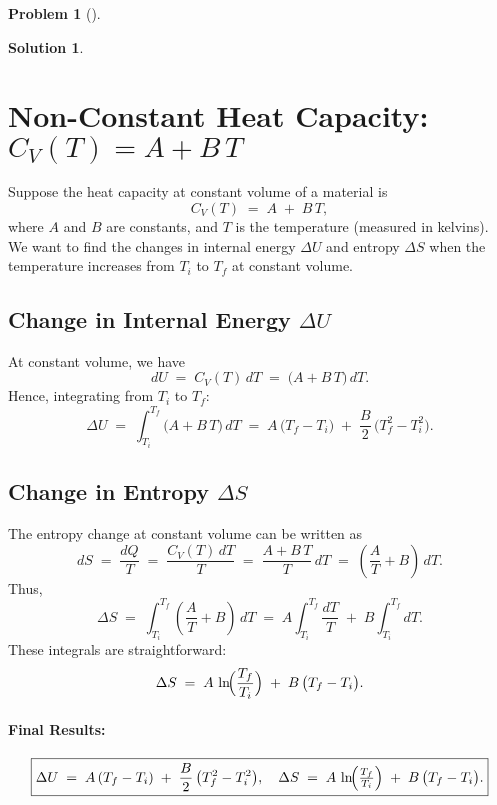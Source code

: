 \documentclass[12pt]{article}
\theoremstyle{definition} %
\newtheorem{solution}{Solution}
\newtheorem{problem}{Problem}
\theoremstyle{plain} %
\begin{document}
\begin{problem}[]
    
\end{problem}
\begin{solution}
    \section*{Non-Constant Heat Capacity: \texorpdfstring{$C_V(T) = A + B\,T$}{CV(T) = A + B T}}

Suppose the heat capacity at constant volume of a material is 
\[
C_V(T) \;=\; A \;+\; B\,T,
\]
where \(A\) and \(B\) are constants, and \(T\) is the temperature 
(measured in kelvins). We want to find the changes in internal energy 
\(\Delta U\) and entropy \(\Delta S\) when the temperature increases 
from \(T_i\) to \(T_f\) at constant volume.

\subsection*{Change in Internal Energy \(\Delta U\)}

At constant volume, we have
\[
dU \;=\; C_V(T)\,dT \;=\; \bigl(A + B\,T\bigr)\,dT.
\]
Hence, integrating from \(T_i\) to \(T_f\):
\[
\Delta U 
\;=\; \int_{T_i}^{T_f} \bigl(A + B\,T\bigr)\,dT 
\;=\; A\,\bigl(T_f - T_i\bigr)
\;+\; \frac{B}{2}\,\bigl(T_f^2 - T_i^2\bigr).
\]

\subsection*{Change in Entropy \(\Delta S\)}

The entropy change at constant volume can be written as
\[
dS \;=\; \frac{dQ}{T} 
\;=\; \frac{C_V(T)\,dT}{T} 
\;=\; \frac{A + B\,T}{T}\,dT 
\;=\; \left(\frac{A}{T} + B\right)\,dT.
\]
Thus,
\[
\Delta S 
\;=\; \int_{T_i}^{T_f} \left(\frac{A}{T} + B\right)\,dT 
\;=\; A \int_{T_i}^{T_f} \frac{dT}{T} 
\;+\; B \int_{T_i}^{T_f} dT.
\]
These integrals are straightforward:
\[
\Delta S 
\;=\; A\,\ln\!\Bigl(\frac{T_f}{T_i}\Bigr)
\;+\; B\,\bigl(T_f - T_i\bigr).
\]

\paragraph{Final Results:}
\[
\boxed{
\Delta U 
\;=\; A\,(T_f - T_i)
\;+\; \frac{B}{2}\,\bigl(T_f^2 - T_i^2\bigr),
\quad
\Delta S 
\;=\; A\,\ln\!\Bigl(\tfrac{T_f}{T_i}\Bigr)
\;+\; B\,\bigl(T_f - T_i\bigr).
}
\]
\end{solution}
\end{document}
